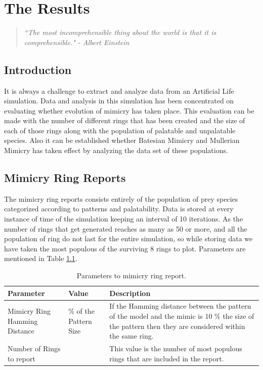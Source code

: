 \chapter{The Results}

\begin{quote}
\textsl{``The most incomprehensible thing about the world is that it is comprehensible." - Albert Einstein}
\end{quote}

\section{Introduction}
It is always a challenge to extract and analyze data from an Artificial Life simulation. Data and analysis in this simulation has been concentrated on evaluating whether evolution of mimicry has taken place. This evaluation can be made with the number of different rings that has been created and the size of each of those rings along with the population of palatable and unpalatable species. Also it can be established whether Batesian Mimicry and Mullerian Mimicry has taken effect by analyzing the data set of these populations.

\section{Mimicry Ring Reports}
The mimicry ring reports consists entirely of the population of prey species categorized according to patterns and palatability. Data is stored at every instance of time of the simulation keeping an interval of 10 iterations. As the number of rings that get generated reaches as many as 50 or more, and all the population of ring do not last for the entire simulation, so while storing data we have taken the most populous of the surviving 8 rings to plot. Parameters are mentioned in Table \ref{tab:ring-report-control-parameters}.

\begin{table}[H]
\centering
\begin{tabular}{| p{2cm} | >{\centering} p{2.2cm} | p{8cm} |}
	\hline
		\textbf{Parameter} & \textbf{Value} & \textbf{Description} \\ \hline
		Mimicry Ring Hamming Distance & 10 \% of the Pattern Size & If the Hamming distance between the pattern of the model and the mimic is 10 \% the size of the pattern then they are considered within the same ring.\\ \hline
		Number of Rings to report & 8 & This value is the number of most populous rings that are included in the report.\\
	\hline
\end{tabular}
\caption{Parameters to mimicry ring report.}
\label{tab:ring-report-control-parameters}
\end{table}

